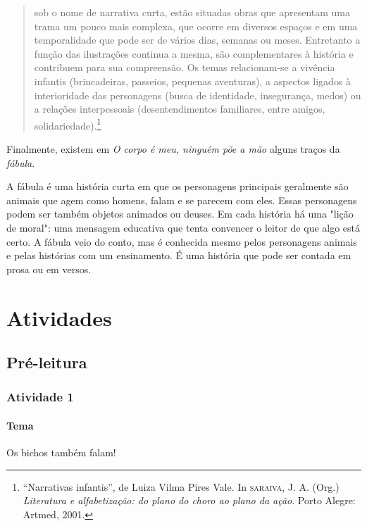 \documentclass[11pt]{extarticle}
\begin{document}
\begin{quote}
sob o nome de narrativa curta, estão situadas obras que apresentam uma trama 
um pouco mais complexa, que ocorre em diversos espaços e em uma temporalidade 
que pode ser de vários dias, semanas ou meses. Entretanto a função das ilustrações 
continua a mesma, são complementares à história e contribuem para sua compreensão. 
Os temas relacionam-se a vivência infantis (brincadeiras, passeios, pequenas aventuras), 
a aspectos ligados à interioridade das personagens (busca de identidade, insegurança, 
medos) ou a relações interpessoais (desentendimentos familiares, entre amigos, solidariedade).\footnote{“Narrativas infantis”, de Luiza Vilma Pires Vale. In \textsc{saraiva}, J. A. (Org.) \textit{Literatura e alfabetização: do plano do choro ao plano da ação}. Porto Alegre: Artmed, 2001.} 
\end{quote}

Finalmente, existem em \textit{O corpo é meu, ninguém põe a mão} alguns traços da \textit{fábula}. 

A fábula é uma história curta em que os personagens principais
geralmente são animais que agem como homens, falam e se parecem com eles.
Essas personagens podem ser também objetos animados ou deuses. Em cada
história há uma "lição de moral": uma mensagem educativa que
tenta convencer o leitor de que algo está certo. A fábula veio do conto, mas
é conhecida mesmo pelos personagens animais e pelas histórias com um ensinamento. 
É uma história que pode ser contada em prosa ou em versos.


\section{Atividades}

\subsection{Pré-leitura}


\subsubsection{Atividade 1}

\paragraph{Tema} Os bichos também falam!
\end{document}
